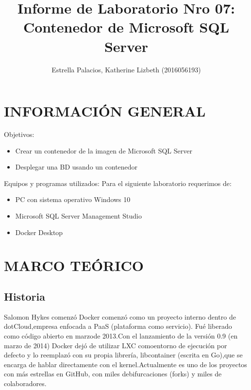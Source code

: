 \documentclass[preprint,12pt]{elsarticle}
\begin{document}
	\begin{frontmatter}
		\title{\huge Informe de Laboratorio Nro 07: Contenedor de Microsoft SQL Server}
		\author{Estrella Palacios, Katherine Lizbeth              	(2016056193)}	
		\address{Universidad Privada de Tacna}
		\address{Escuela Profesional de Ingeniería de Sistemas}
		\address{Tacna, Perú}
	\end{frontmatter}

\section{INFORMACIÓN GENERAL}
Objetivos:
	\begin{itemize}
		\item Crear un contenedor de la imagen de Microsoft SQL Server 
		\item Desplegar una BD usando un contenedor
	\end{itemize}
Equipos y programas utilizados:
Para el siguiente laboratorio requerimos de:
	\begin{itemize}
		\item PC con sistema operativo Windows 10
		\item Microsoft SQL Server Management Studio
		\item Docker Desktop
	\end{itemize}

\section{MARCO TEÓRICO}
\subsection{\textbf{Historia}}
Salomon Hykes comenzó Docker comenzó como un proyecto interno dentro de dotCloud,empresa enfocada a PaaS (plataforma como servicio). Fué liberado como código abierto en marzode 2013.Con el lanzamiento de la versión 0.9 (en marzo de 2014) Docker dejó de utilizar LXC comoentorno de ejecución por defecto y lo reemplazó con su propia librería, libcontainer (escrita en Go),que se encarga de hablar directamente con el kernel.Actualmente es uno de los proyectos con más estrellas en GitHub, con miles debifurcaciones (forks) y miles de colaboradores.
\end{document}
